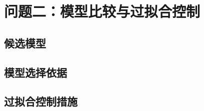 \section{问题二：模型比较与过拟合控制}\label{sec:model_q2}
\subsection{候选模型}\label{sec:q2_candidates}
\subsection{模型选择依据}\label{sec:q2_selection}
\subsection{过拟合控制措施}\label{sec:q2_overfitting}
